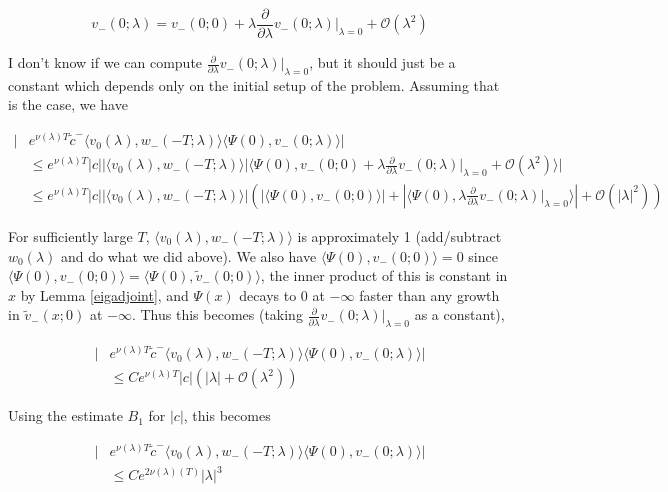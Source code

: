 \documentclass[12pt]{article}
\begin{document}
\begin{enumerate}
\[
v_-(0; \lambda) = v_-(0; 0) + \lambda \frac{\partial}{\partial \lambda}v_-(0; \lambda)\Big|_{\lambda = 0} + \mathcal{O}(\lambda^2)
\]

I don't know if we can compute $\frac{\partial}{\partial \lambda}v_-(0; \lambda)\Big|_{\lambda = 0}$, but it should just be a constant which depends only on the initial setup of the problem. Assuming that is the case, we have 

\begin{align*}
|&e^{\nu(\lambda)T} \tilde{c}^- \langle v_0(\lambda), w_-(-T; \lambda) \rangle \langle \Psi(0), v_-(0; \lambda) \rangle|\\
&\leq e^{\nu(\lambda)T}|c| |\langle v_0(\lambda), w_-(-T; \lambda) \rangle|\langle \Psi(0), v_-(0; 0) + \lambda \frac{\partial}{\partial \lambda}v_-(0; \lambda)\Big|_{\lambda = 0} + \mathcal{O}(\lambda^2) \rangle| \\
&\leq e^{\nu(\lambda)T}|c| |\langle v_0(\lambda), w_-(-T; \lambda) \rangle| \left( |\langle \Psi(0), v_-(0; 0) \rangle| +  |\langle \Psi(0), \lambda \frac{\partial}{\partial \lambda}v_-(0; \lambda)\Big|_{\lambda = 0} \rangle| + \mathcal{O}(|\lambda|^2) \right)
\end{align*}

For sufficiently large $T$, $\langle v_0(\lambda), w_-(-T; \lambda) \rangle$ is approximately 1 (add/subtract $w_0(\lambda)$ and do what we did above). We also have $\langle \Psi(0), v_-(0; 0) \rangle = 0$ since $\langle \Psi(0), v_-(0; 0) \rangle = \langle \Psi(0), \tilde{v}_-(0; 0) \rangle$, the inner product of this is constant in $x$ by Lemma \ref{eigadjoint}, and $\Psi(x)$ decays to 0 at $-\infty$ faster than any growth in $\tilde{v}_-(x; 0)$ at $-\infty$. Thus this becomes (taking $\frac{\partial}{\partial \lambda}v_-(0; \lambda)\Big|_{\lambda = 0}$ as a constant),

\begin{align*}
|&e^{\nu(\lambda)T} \tilde{c}^- \langle v_0(\lambda), w_-(-T; \lambda) \rangle \langle \Psi(0), v_-(0; \lambda) \rangle|\\
&\leq C e^{\nu(\lambda)T}|c| (|\lambda| + \mathcal{O}(\lambda^2) )
\end{align*}

Using the estimate $B_1$ for $|c|$, this becomes 

\begin{align*}
|&e^{\nu(\lambda)T} \tilde{c}^- \langle v_0(\lambda), w_-(-T; \lambda) \rangle \langle \Psi(0), v_-(0; \lambda) \rangle|\\
&\leq C e^{2 \nu(\lambda)(T)}|\lambda|^3
\end{align*}


\end{enumerate}
\end{document}
